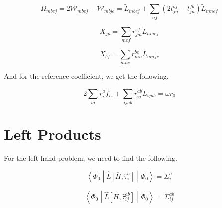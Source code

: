 \documentclass{article}
\begin{document}
\begin{equation}
  \Omega_{mbej} = 2\mathcal{W}_{mbej} - \mathcal{W}_{mbje} = \tilde{L}_{mbej} + \sum_{nf}\left(2t_{jn}^{bf} - t_{jn}^{fb}\right)\tilde{L}_{mnef}
\end{equation}

\begin{equation}
  X_{jn} = \sum_{mef}r_{jm}^{ef}\tilde{L}_{nmef}
\end{equation}

\begin{equation}
  X_{bf} = \sum_{mne} r_{mn}^{be}\tilde{L}_{mnfe}
\end{equation}

And for the reference coefficient, we get the following.

\begin{equation}
  2\sum_{ia}r_i^a\tilde{f}_{ia} + \sum_{ijab}r_{ij}^{ab}\tilde{L}_{ijab} = \omega r_0
\end{equation}

\section{Left Products}

For the left-hand problem, we need to find the following.

\begin{equation}
  \left<\Phi_0\middle|\hat{L}\left[\overline{H}, \hat{\tau}_i^a\right]\middle|\Phi_0\right> = \Sigma_i^a
\end{equation}

\begin{equation}
  \left<\Phi_0\middle|\hat{L}\left[\overline{H}, \hat{\tau}_{ij}^{ab}\right]\middle|\Phi_0\right> = \Sigma_{ij}^{ab}
\end{equation}
\end{document}
